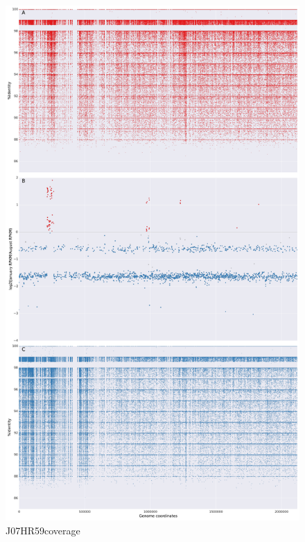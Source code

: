 \begin{figure}[!hbtp]
  \centering
  \includegraphics[width=\textwidth,height=\textheight,keepaspectratio]{Chapter5/Figures/coverage_plots/J07HR59_coverage.pdf}
  \caption{J07HR59coverage}
  \label{J07HR59coverage}
\end{figure}

